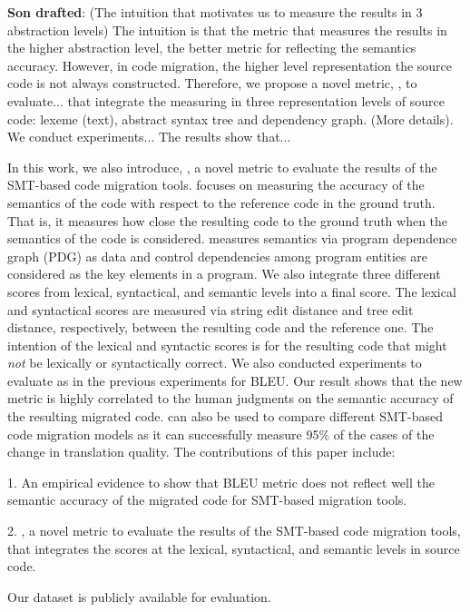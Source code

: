 \textbf{Son drafted}: (The intuition that motivates us to measure the results in 3 abstraction levels)
The intuition is that the metric that measures the results 
in the higher abstraction level, the better metric for reflecting the semantics 
accuracy. However, in code migration, the higher level representation the source 
code is not always constructed. Therefore, we propose a novel metric, {\model}, to evaluate...
 that integrate the measuring in three representation levels of source code: lexeme 
(text), abstract syntax tree and dependency graph. (More details). We conduct experiments... The results show that...

In this work, we also introduce, {\model}, a novel metric to evaluate
the results of the SMT-based code migration tools. {\model} focuses on
measuring the accuracy of the semantics of the code with respect to
the reference code in the ground truth. That is, it measures how close
the resulting code to the ground truth when the semantics of the code
is considered. {\model} measures semantics via program dependence
graph (PDG) as data and control dependencies among program entities
are considered as the key elements in a program. We also integrate
three different scores from lexical, syntactical, and semantic levels
into a final {\model} score. The lexical and syntactical scores are
measured via string edit distance and tree edit distance,
respectively, between the resulting code and the reference one. The
intention of the lexical and syntactic scores is for the resulting
code that might {\em not} be lexically or syntactically correct. We
also conducted experiments to evaluate {\model} as in the previous
experiments for BLEU. Our result shows that the new metric {\model} is
highly correlated to the human judgments on the semantic accuracy of
the resulting migrated code. {\model} can also be used to compare
different SMT-based code migration models as it can successfully
measure 95\% of the cases of the change in translation quality. The
contributions of this paper include:

1. An empirical evidence to show that BLEU metric does not reflect
well the semantic accuracy of the migrated code for SMT-based
migration tools.

2. {\model}, a novel metric to evaluate the results of the SMT-based
code migration tools, that integrates the scores at the lexical,
syntactical, and semantic levels in source code.

Our dataset is publicly available for evaluation.


